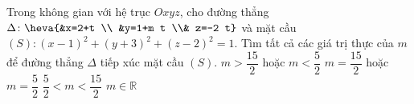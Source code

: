 \begin{ex}%
	Trong không gian với hệ trục $Oxyz$, cho đường thẳng $\Delta\colon\heva{&x=2+t \\ &y=1+m t \\& z=-2 t}$ và mặt cầu $(S)\colon (x-1)^2+(y+3)^2+(z-2)^2=1$. Tìm tất cả các giá trị thực của $m$ để đường thẳng $\Delta$ tiếp xúc mặt cầu $(S)$.
	\choice 
		{$m>\dfrac{15}{2}$ hoặc $m<\dfrac{5}{2}$}
		{\True $m=\dfrac{15}{2}$ hoặc $m=\dfrac{5}{2}$}
		{$\dfrac{5}{2}<m<\dfrac{15}{2}$}
		{$m \in \mathbb{R}$}
\end{ex}

